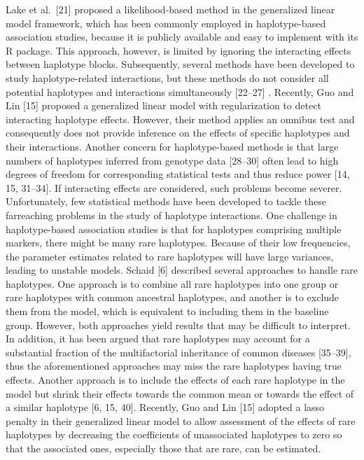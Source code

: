 \documentclass[
]{book}
\begin{document}
Lake et al.~{[}21{]} proposed a likelihood-based method in the generalized linear model framework, which has been commonly employed in haplotype-based association studies, because it is publicly available and easy to implement with its R package. This approach, however, is limited by ignoring the interacting effects between haplotype blocks. Subsequently, several methods have been developed to study haplotype-related interactions, but these methods do not consider all potential haplotypes and interactions simultaneously {[}22--27{]} . Recently, Guo and Lin {[}15{]} proposed a generalized linear model with regularization to detect interacting haplotype effects. However, their method applies an omnibus test and consequently does not provide inference on the effects of specific haplotypes and their interactions. Another concern for haplotype-based methods is that large numbers of haplotypes inferred from genotype data {[}28--30{]} often lead to high degrees of freedom for corresponding statistical tests and thus reduce power {[}14, 15, 31--34{]}. If interacting effects are considered, such problems become severer. Unfortunately, few statistical methods have been developed to tackle these farreaching problems in the study of haplotype interactions. One challenge in haplotype-based association studies is that for haplotypes comprising multiple markers, there might be many rare haplotypes. Because of their low frequencies, the parameter estimates related to rare haplotypes will have large variances, leading to unstable models. Schaid {[}6{]} described several approaches to handle rare haplotypes. One approach is to combine all rare haplotypes into one group or rare haplotypes with common ancestral haplotypes, and another is to exclude them from the model, which is equivalent to including them in the baseline group. However, both approaches yield results that may be difficult to interpret. In addition, it has been argued that rare haplotypes may account for a substantial fraction of the multifactorial inheritance of common diseases {[}35--39{]}, thus the aforementioned approaches may miss the rare haplotypes having true effects. Another approach is to include the effects of each rare haplotype in the model but shrink their effects towards the common mean or towards the effect of a similar haplotype {[}6, 15, 40{]}. Recently, Guo and Lin {[}15{]} adopted a lasso penalty in their generalized linear model to allow assessment of the effects of rare haplotypes by decreasing the coefficients of unassociated haplotypes to zero so that the associated ones, especially those that are rare, can be estimated.
\end{document}
